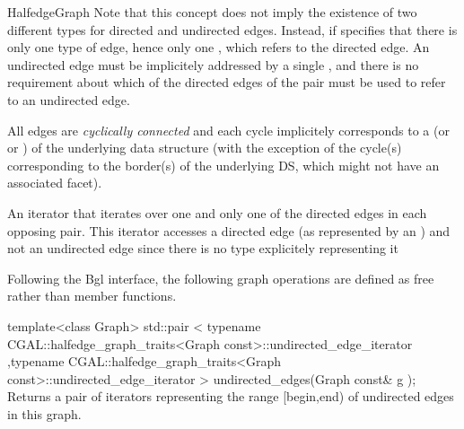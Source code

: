 \begin{ccRefConcept}{HalfedgeGraph}
Note that this concept does not imply the existence of two different types
for directed and undirected edges. Instead, if specifies that there is only one type of edge,
hence only one , which refers to the directed edge.
An undirected edge must be implicitely addressed by a single ,
and there is no requirement about which of the directed edges of the pair must
be used to refer to an undirected edge.

All edges are {\em cyclically connected} and each cycle implicitely
corresponds to a  (or  or ) of the
underlying data structure (with the exception of the cycle(s)
corresponding to the border(s) of the underlying DS, which might not
have an associated facet).


\ccRefines
{}

\ccTypes
  {An iterator that iterates over one and only one of the directed edges
  in each opposing pair. This iterator accesses a directed edge 
  (as represented by an ) and not an undirected edge 
  since there is no type explicitely representing it}{}
  
\ccOperations

Following the {\sc Bgl} interface, the following graph operations are defined as free rather than member functions.

  \ccFunction
  {template<class Graph>
  std::pair < typename CGAL::halfedge_graph_traits<Graph const>::undirected_edge_iterator
             ,typename CGAL::halfedge_graph_traits<Graph const>::undirected_edge_iterator
             >   
  undirected_edges(Graph const& g );
  }
  {Returns a pair of iterators representing the range [begin,end) 
  of undirected edges in this graph.}

\ccHasModels
{}\\
\\

\end{ccRefConcept}

